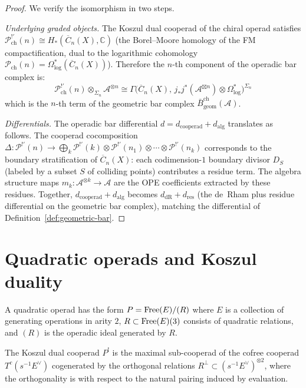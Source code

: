 \begin{proof}
We verify the isomorphism in two steps.

\emph{Underlying graded objects.}
The Koszul dual cooperad of the chiral operad satisfies
$\mathcal{P}_{\mathrm{ch}}^{!'}(n)
\cong H_*(\overline{C}_n(X), \mathbb{C})$
(the Borel--Moore homology of the FM compactification, dual to the
logarithmic cohomology
$\mathcal{P}_{\mathrm{ch}}(n) = \Omega^*_{\log}(\overline{C}_n(X))$).
Therefore the $n$-th component of the operadic bar complex is:
\[
\mathcal{P}_{\mathrm{ch}}^{!'}(n) \otimes_{\Sigma_n} \mathcal{A}^{\otimes n}
\cong \Gamma\bigl(\overline{C}_n(X),\,
j_* j^*(\mathcal{A}^{\boxtimes n}) \otimes \Omega^*_{\log}\bigr)^{\Sigma_n}
\]
which is the $n$-th term of the geometric bar complex
$\bar{B}^{\mathrm{ch}}_{\mathrm{geom}}(\mathcal{A})$.

\emph{Differentials.}
The operadic bar differential $d = d_{\mathrm{cooperad}} +
d_{\mathrm{alg}}$ translates as follows.
The cooperad cocomposition
$\Delta\colon \mathcal{P}^{!'}(n)
\to \bigoplus_{k} \mathcal{P}^{!'}(k) \otimes
\mathcal{P}^{!'}(n_1) \otimes \cdots \otimes \mathcal{P}^{!'}(n_k)$
corresponds to the boundary stratification of $\overline{C}_n(X)$:
each codimension-$1$ boundary divisor $D_S$ (labeled by a subset $S$ of
colliding points) contributes a residue term.  The algebra structure maps
$m_k\colon \mathcal{A}^{\otimes k} \to \mathcal{A}$ are the OPE
coefficients extracted by these residues.  Together,
$d_{\mathrm{cooperad}} + d_{\mathrm{alg}}$ becomes
$d_{\mathrm{dR}} + d_{\mathrm{res}}$
(the de~Rham plus residue differential on the geometric bar complex),
matching the differential of
Definition~\ref{def:geometric-bar}.
\end{proof}

\section{Quadratic operads and Koszul duality}
 
\begin{definition}
A quadratic operad has the form $P = \operatorname{Free}(E)/(R)$ where $E$ is a collection of generating operations in arity $2$, $R \subset \operatorname{Free}(E)(3)$ consists of quadratic relations, and $(R)$ is the operadic ideal generated by $R$.
\end{definition}
 
\begin{definition}
The Koszul dual cooperad $P^!$ is the maximal sub-cooperad of the cofree cooperad $T^c(s^{-1}E^\vee)$ cogenerated by the orthogonal relations $R^\perp \subset (s^{-1}E^\vee)^{\otimes 2}$, where the orthogonality is with respect to the natural pairing induced by evaluation.
\end{definition}
 
